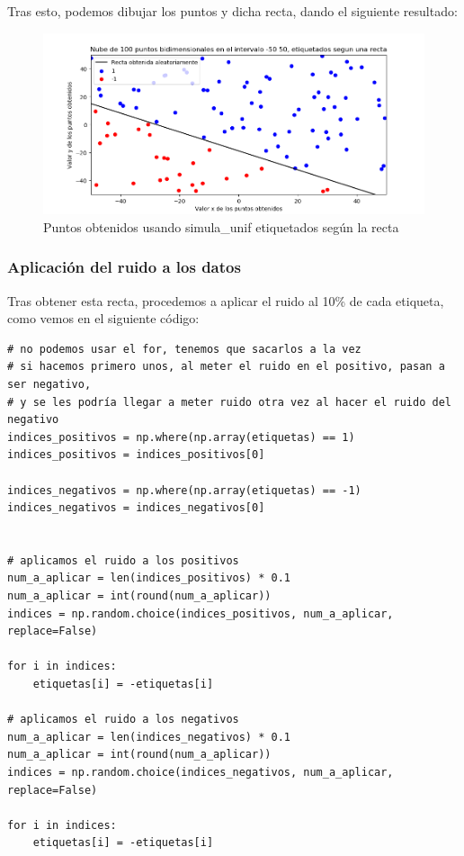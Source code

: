 \documentclass[12pt, spanish]{article}
\begin{document}
Tras esto, podemos dibujar los puntos y dicha recta, dando el siguiente resultado:

\begin{figure}[H]
  \centering
      \includegraphics[scale = 0.70]{ej1-2-1.png}
 		 \caption{Puntos obtenidos usando simula\_unif etiquetados según la recta}
  		\label{fig:ej1-2-1}

\end{figure}

\newpage

\subsubsection{Aplicación del ruido a los datos}

Tras obtener esta recta, procedemos a aplicar el ruido al 10\% de cada etiqueta, como vemos en el siguiente código:

\begin{lstlisting}
# no podemos usar el for, tenemos que sacarlos a la vez
# si hacemos primero unos, al meter el ruido en el positivo, pasan a ser negativo,
# y se les podría llegar a meter ruido otra vez al hacer el ruido del negativo
indices_positivos = np.where(np.array(etiquetas) == 1)
indices_positivos = indices_positivos[0]

indices_negativos = np.where(np.array(etiquetas) == -1)
indices_negativos = indices_negativos[0]


# aplicamos el ruido a los positivos
num_a_aplicar = len(indices_positivos) * 0.1
num_a_aplicar = int(round(num_a_aplicar))
indices = np.random.choice(indices_positivos, num_a_aplicar, replace=False)

for i in indices:
	etiquetas[i] = -etiquetas[i]

# aplicamos el ruido a los negativos
num_a_aplicar = len(indices_negativos) * 0.1
num_a_aplicar = int(round(num_a_aplicar))
indices = np.random.choice(indices_negativos, num_a_aplicar, replace=False)

for i in indices:
	etiquetas[i] = -etiquetas[i]

\end{lstlisting}
\end{document}
